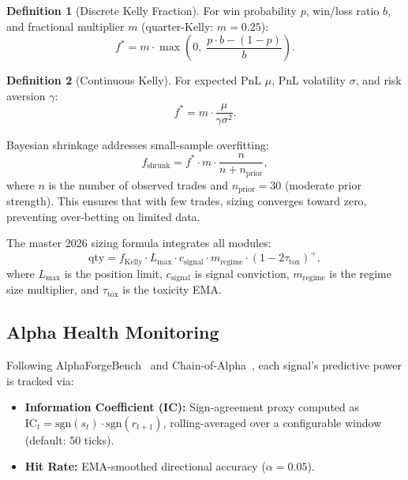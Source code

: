 \documentclass[11pt]{article}
\theoremstyle{definition}
\newtheorem{definition}{Definition}[section]
\begin{document}
\begin{definition}[Discrete Kelly Fraction]
For win probability $p$, win/loss ratio $b$, and fractional
multiplier $m$ (quarter-Kelly: $m = 0.25$):
\begin{equation}
  f^* = m \cdot \max\!\left(0,\;
    \frac{p \cdot b - (1-p)}{b}\right).
  \label{eq:kelly-discrete}
\end{equation}
\end{definition}

\begin{definition}[Continuous Kelly]
For expected PnL $\mu$, PnL volatility $\sigma$, and risk aversion
$\gamma$:
\begin{equation}
  f^* = m \cdot \frac{\mu}{\gamma \sigma^2}.
  \label{eq:kelly-continuous}
\end{equation}
\end{definition}

Bayesian shrinkage addresses small-sample overfitting:
\begin{equation}
  f_{\text{shrunk}} = f^* \cdot m \cdot
  \frac{n}{n + n_{\text{prior}}},
  \label{eq:kelly-bayesian}
\end{equation}
where $n$ is the number of observed trades and $n_{\text{prior}} = 30$
(moderate prior strength). This ensures that with few trades, sizing
converges toward zero, preventing over-betting on limited data.

The master 2026 sizing formula integrates all modules:
\begin{equation}
  \text{qty} = f_{\text{Kelly}} \cdot L_{\max} \cdot c_{\text{signal}}
  \cdot m_{\text{regime}} \cdot (1 - 2\tau_{\text{tox}})^+,
  \label{eq:master-sizing}
\end{equation}
where $L_{\max}$ is the position limit, $c_{\text{signal}}$ is signal
conviction, $m_{\text{regime}}$ is the regime size multiplier, and
$\tau_{\text{tox}}$ is the toxicity EMA.

\subsection{Alpha Health Monitoring}
\label{sec:alpha-health}

Following AlphaForgeBench~\cite{alphaforge2026} and
Chain-of-Alpha~\cite{chainofalpha2025}, each signal's predictive
power is tracked via:
\begin{itemize}[leftmargin=*,topsep=2pt,itemsep=1pt]
  \item \textbf{Information Coefficient (IC):} Sign-agreement proxy
        computed as $\text{IC}_t = \text{sgn}(s_t) \cdot
        \text{sgn}(r_{t+1})$, rolling-averaged over a configurable
        window (default: 50 ticks).
  \item \textbf{Hit Rate:} EMA-smoothed directional accuracy
        ($\alpha = 0.05$).
\end{itemize}
\end{document}
